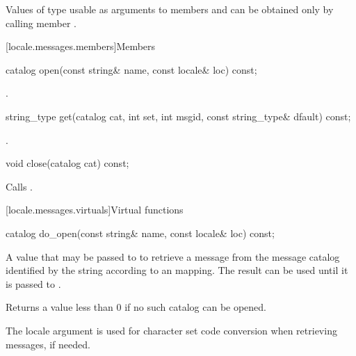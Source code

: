 \pnum
Values of type
usable as arguments to members
and
can be obtained only by calling member
.

[locale.messages.members]{Members}

%
\begin{itemdecl}
catalog open(const string& name, const locale& loc) const;
\end{itemdecl}

\begin{itemdescr}
\pnum
\returns
{}.
\end{itemdescr}

%
\begin{itemdecl}
string_type get(catalog cat, int set, int msgid, const string_type& dfault) const;
\end{itemdecl}

\begin{itemdescr}
\pnum
\returns
{}.
\end{itemdescr}

%
\begin{itemdecl}
void close(catalog cat) const;
\end{itemdecl}

\begin{itemdescr}
\pnum
\effects
Calls
.
\end{itemdescr}

[locale.messages.virtuals]{Virtual functions}

%
\begin{itemdecl}
catalog do_open(const string& name, const locale& loc) const;
\end{itemdecl}

\begin{itemdescr}
\pnum
\returns
A value that may be passed to
to retrieve a message from the message catalog identified by the string
 according to an  mapping.
The result can be used until it is passed to
.

\pnum
Returns a value less than 0 if no such catalog can be opened.

\pnum
\remarks
The locale argument 
is used for character set code conversion when retrieving
messages, if needed.
\end{itemdescr}

